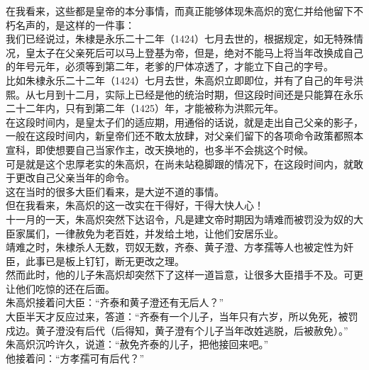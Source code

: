 \begin{multicols}{\theparacolNo}
在我看来，这些都是皇帝的本分事情，而真正能够体现朱高炽的宽仁并给他留下不朽名声的，是这样的一件事：\\

我们已经说过，朱棣是永乐二十二年（1424）七月去世的，根据规定，如无特殊情况，皇太子在父亲死后可以马上登基为帝，但是，绝对不能马上将当年改换成自己的年号元年，必须等到第二年，老爹的尸体凉透了，才能立下自己的字号。\\

比如朱棣永乐二十二年（1424）七月去世，朱高炽立即即位，并有了自己的年号洪熙。从七月到十二月，实际上已经是他的统治时期，但这段时间还是只能算在永乐二十二年内，只有到第二年（1425）年，才能被称为洪熙元年。\\

在这段时间内，是皇太子们的适应期，用通俗的话说，就是走出自己父亲的影子，一般在这段时间内，新皇帝们还不敢太放肆，对父亲们留下的各项命令政策都照本宣科，即使想要自己当家作主，改天换地的，也多半不会挑这个时候。\\

可是就是这个忠厚老实的朱高炽，在尚未站稳脚跟的情况下，在这段时间内，就敢于更改自己父亲当年的命令。\\

这在当时的很多大臣们看来，是大逆不道的事情。\\

但在我看来，朱高炽的这一改实在干得好，干得大快人心！\\

十一月的一天，朱高炽突然下达诏令，凡是建文帝时期因为靖难而被罚没为奴的大臣家属们，一律赦免为老百姓，并发给土地，让他们安居乐业。\\

靖难之时，朱棣杀人无数，罚奴无数，齐泰、黄子澄、方孝孺等人也被定性为奸臣，此事已是板上钉钉，断无更改之理。\\

然而此时，他的儿子朱高炽却突然下了这样一道旨意，让很多大臣措手不及。可更让他们吃惊的还在后面。\\

朱高炽接着问大臣：“齐泰和黄子澄还有无后人？”\\

大臣半天才反应过来，答道：“齐泰有一个儿子，当年只有六岁，所以免死，被罚戍边。黄子澄没有后代（后得知，黄子澄有个儿子当年改姓逃脱，后被赦免）。”\\

朱高炽沉吟许久，说道：“赦免齐泰的儿子，把他接回来吧。”\\

他接着问：“方孝孺可有后代？”\\


\end{multicols}
